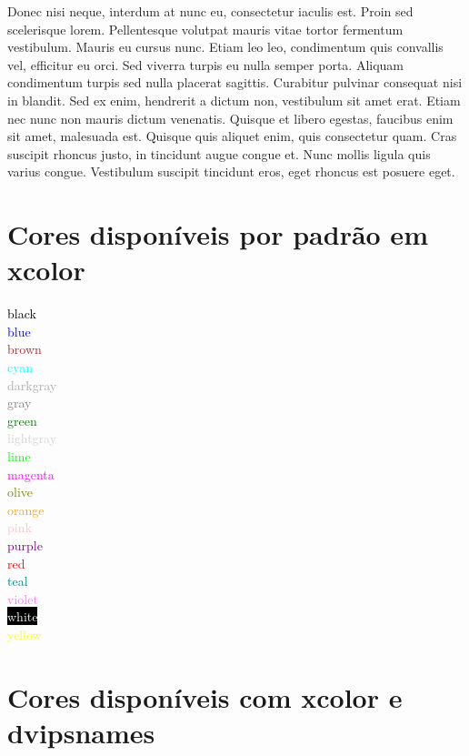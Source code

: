 \documentclass[12pt]{article}
\begin{document}
Donec nisi neque, interdum at nunc eu, consectetur iaculis est. Proin sed scelerisque lorem. Pellentesque volutpat mauris vitae tortor fermentum vestibulum. Mauris eu cursus nunc. Etiam leo leo, condimentum quis convallis vel, efficitur eu orci. Sed viverra turpis eu nulla semper porta. Aliquam condimentum turpis sed nulla placerat sagittis. Curabitur pulvinar consequat nisi in blandit. Sed ex enim, hendrerit a dictum non, vestibulum sit amet erat. Etiam nec nunc non mauris dictum venenatis. Quisque et libero egestas, faucibus enim sit amet, malesuada est. Quisque quis aliquet enim, quis consectetur quam. Cras suscipit rhoncus justo, in tincidunt augue congue et. Nunc mollis ligula quis varius congue. Vestibulum suscipit tincidunt eros, eget rhoncus est posuere eget.

\newpage
\pagecolor{white}
\section{Cores disponíveis por padrão em xcolor}

\textcolor{black}{black}\\
\textcolor{blue}{blue}\\
\textcolor{brown}{brown}\\
\textcolor{cyan}{cyan}\\
\textcolor{darkgray}{darkgray}\\
\textcolor{gray}{gray}\\
\textcolor{green}{green}\\
\textcolor{lightgray}{lightgray}\\
\textcolor{lime}{lime}\\
\textcolor{magenta}{magenta}\\
\textcolor{olive}{olive}\\
\textcolor{orange}{orange}\\
\textcolor{pink}{pink}\\
\textcolor{purple}{purple}\\
\textcolor{red}{red}\\
\textcolor{teal}{teal}\\
\textcolor{violet}{violet}\\
\colorbox{black}{\textcolor{white}{white}}\\
\textcolor{yellow}{yellow}

\section{Cores disponíveis com xcolor e dvipsnames}
\end{document}
